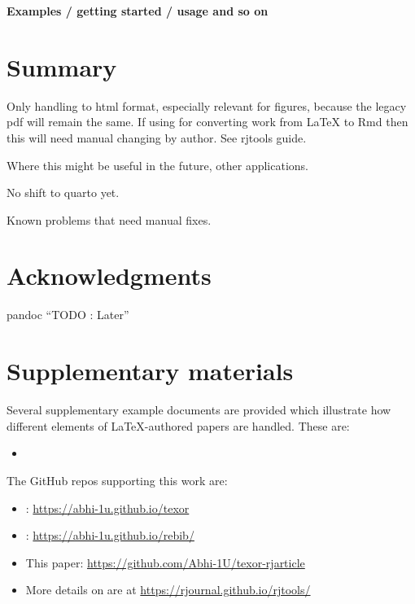 \textbf{Examples / getting started / usage and so on}

\hypertarget{summary}{%
\section{Summary}\label{summary}}

Only handling to html format, especially relevant for figures, because the legacy pdf will remain the same. If using for converting work from LaTeX to Rmd then this will need manual changing by author. See rjtools guide.

Where this might be useful in the future, other applications.

No shift to quarto yet.

Known problems that need manual fixes.

\hypertarget{acknowledgments}{%
\section{Acknowledgments}\label{acknowledgments}}

pandoc
``TODO : Later''

\hypertarget{supplementary-materials}{%
\section{Supplementary materials}\label{supplementary-materials}}

Several supplementary example documents are provided which illustrate how different elements of LaTeX-authored papers are handled. These are:

\begin{itemize}
\tightlist
\item
\end{itemize}

The GitHub repos supporting this work are:

\begin{itemize}
\tightlist
\item
  : \url{https://abhi-1u.github.io/texor}
\item
  : \url{https://abhi-1u.github.io/rebib/}
\item
  This paper: \url{https://github.com/Abhi-1U/texor-rjarticle}
\item
  More details on  are at \url{https://rjournal.github.io/rjtools/}
\end{itemize}

